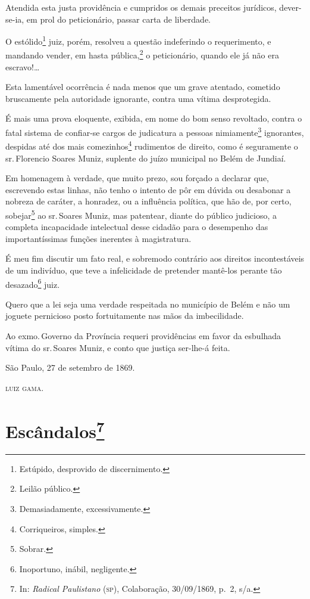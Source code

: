 Atendida esta justa providência e cumpridos os demais preceitos
jurídicos, dever-se-ia, em prol do peticionário, passar carta de
liberdade.

O estólido\footnote{Estúpido, desprovido de discernimento.} juiz,
porém, resolveu a questão indeferindo o requerimento, e mandando vender,
em hasta pública,\footnote{Leilão público.} o peticionário, quando ele
já não era escravo!\ldots{}

Esta lamentável ocorrência é nada menos que um grave atentado, cometido
bruscamente pela autoridade ignorante, contra uma vítima desprotegida.

É mais uma prova eloquente, exibida, em nome do bom senso revoltado,
contra o fatal sistema de confiar-se cargos de judicatura a pessoas
nimiamente\footnote{Demasiadamente, excessivamente.} ignorantes,
despidas até dos mais comezinhos\footnote{Corriqueiros, simples.}
rudimentos de direito, como é seguramente o sr.\,Florencio Soares Muniz,
suplente do juízo municipal no Belém de Jundiaí.

Em homenagem à verdade, que muito prezo, sou forçado a declarar que,
escrevendo estas linhas, não tenho o intento de pôr em dúvida ou
desabonar a nobreza de caráter, a honradez, ou a influência política,
que hão de, por certo, sobejar\footnote{Sobrar.} ao sr.\,Soares Muniz,
mas patentear, diante do público judicioso, a completa incapacidade
intelectual desse cidadão para o desempenho das importantíssimas funções
inerentes à magistratura.

É meu fim discutir um fato real, e sobremodo contrário aos direitos
incontestáveis de um indivíduo, que teve a infelicidade de pretender
mantê-los perante tão desazado\footnote{Inoportuno, inábil,
  negligente.} juiz.

Quero que a lei seja uma verdade respeitada no município de Belém e não
um joguete pernicioso posto fortuitamente nas mãos da imbecilidade.

Ao exmo.\,Governo da Província requeri providências em favor da esbulhada
vítima do sr.\,Soares Muniz, e conto que justiça ser-lhe-á feita.
\begin{flushright}
São Paulo, 27 de setembro de 1869.

\textsc{luiz gama}.
\end{flushright}
\chapter{Escândalos\footnote{In: \emph{Radical Paulistano} (\textsc{sp}),
  Colaboração, 30/09/1869, p.~2, s/a.}}

